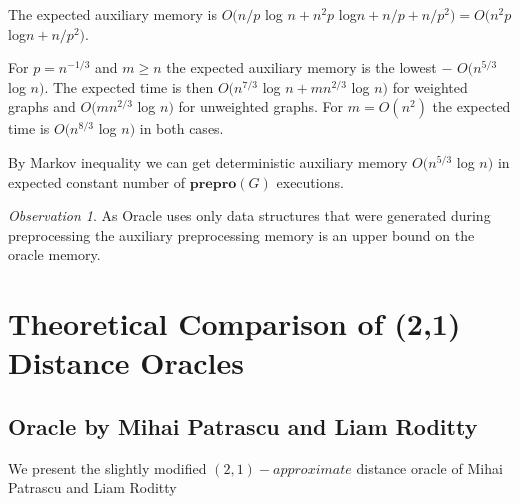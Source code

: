 \documentclass[shortabstract, lic, english]{iithesis}
\theoremstyle{definition} \newtheorem{definition}{Definition}[chapter]
\theoremstyle{remark} \newtheorem{remark}[definition]{Observation}
\theoremstyle{plain} \newtheorem{theorem}[definition]{Theorem}
\theoremstyle{plain} \newtheorem{lemma}[definition]{Lemma}
\theoremstyle{plain} \newtheorem{conjecture}[definition]{Conjecture}
\DeclarePairedDelimiter{\ceil}{\lceil}{\rceil}
\begin{document}
The expected auxiliary memory is $O(n/p $ log $ n + n^2p$ log$ n + n/p + n/p^2) = O(n^2p$ log$ n + n/p^2)$.

For $p = n^{-1/3}$ and $m \geq n$ the expected auxiliary memory is the lowest $-$ $O(n^{5/3} $ log $ n)$.
The expected time is then $O(n^{7/3} $ log $ n + mn^{2/3}$ log $ n)$ for weighted graphs and
$O(mn^{2/3}$ log $ n)$ for unweighted graphs. For $m = O(n^2)$ the expected time is $O(n^{8/3} $ log $n)$ in both cases.

By Markov inequality we can get deterministic auxiliary memory $O(n^{5/3} $ log $ n)$ in expected constant number of $\mathbf{prepro}(G)$ executions.

\begin{remark}
As Oracle uses only data structures that were generated during preprocessing the auxiliary preprocessing memory is an upper bound on the oracle memory.
\end{remark}






\chapter{Theoretical Comparison of (2,1) Distance Oracles} \label{21TheoreticalComparison}

\section{Oracle by Mihai Patrascu and Liam Roditty}

We present the slightly modified $(2,1)-approximate$ distance oracle of Mihai Patrascu and Liam Roditty \cite{21OracleLessMemory}

\noindent{}
\end{document}
